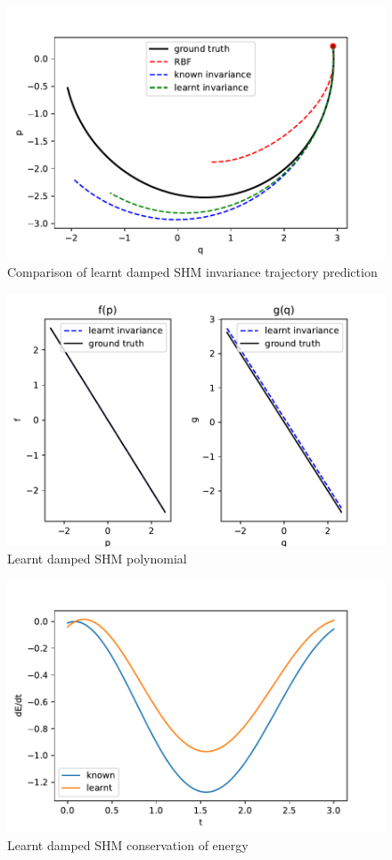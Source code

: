 \documentclass{statsmsc}
\begin{document}
\begin{figure}[H] 
  \includegraphics[width=0.6\linewidth]{../codes/figures/parameterised_damped_shm_predicted_trajectory.pdf}
  \centering
  \caption{Comparison of learnt damped SHM invariance trajectory prediction}
  \label{fig:parameterised_damped_shm_trajectory}
\end{figure}

\begin{figure}[H] 
  \includegraphics[width=0.6\linewidth]{../codes/figures/parameterised_damped_shm_learnt_polynomial.pdf}
  \centering
  \caption{Learnt damped SHM polynomial}
  \label{fig:parameterised_damped_shm_polynomial}
\end{figure}

\begin{figure}[H] 
  \includegraphics[width=0.6\linewidth]{../codes/figures/parameterised_damped_shm_conservation_of_energy.pdf}
  \centering
  \caption{Learnt damped SHM conservation of energy}
  \label{fig:parameterised_damped_shm_conserve_energy}
\end{figure}
\end{document}
